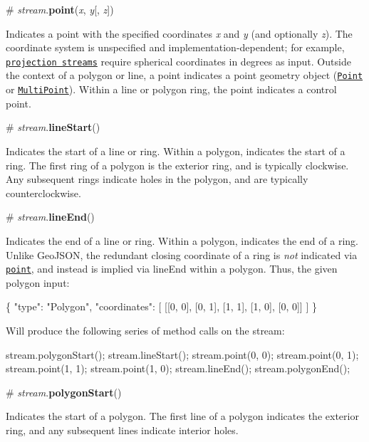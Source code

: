 \label{_stream_point}%
\# {\itshape stream}.{\bfseries point}({\itshape x}, {\itshape y}\mbox{[}, {\itshape z}\mbox{]})

Indicates a point with the specified coordinates {\itshape x} and {\itshape y} (and optionally {\itshape z}). The coordinate system is unspecified and implementation-\/dependent; for example, \href{https://github.com/d3/d3-geo-projection}{\tt projection streams} require spherical coordinates in degrees as input. Outside the context of a polygon or line, a point indicates a point geometry object (\href{http://www.geojson.org/geojson-spec.html#point}{\tt Point} or \href{http://www.geojson.org/geojson-spec.html#multipoint}{\tt Multi\+Point}). Within a line or polygon ring, the point indicates a control point.

\label{_stream_lineStart}%
\# {\itshape stream}.{\bfseries line\+Start}()

Indicates the start of a line or ring. Within a polygon, indicates the start of a ring. The first ring of a polygon is the exterior ring, and is typically clockwise. Any subsequent rings indicate holes in the polygon, and are typically counterclockwise.

\label{_stream_lineEnd}%
\# {\itshape stream}.{\bfseries line\+End}()

Indicates the end of a line or ring. Within a polygon, indicates the end of a ring. Unlike Geo\+J\+S\+ON, the redundant closing coordinate of a ring is {\itshape not} indicated via \href{#point}{\tt point}, and instead is implied via line\+End within a polygon. Thus, the given polygon input\+:


\begin{DoxyCode}
\{
  "type": "Polygon",
  "coordinates": [
    [[0, 0], [0, 1], [1, 1], [1, 0], [0, 0]]
  ]
\}
\end{DoxyCode}


Will produce the following series of method calls on the stream\+:


\begin{DoxyCode}
stream.polygonStart();
stream.lineStart();
stream.point(0, 0);
stream.point(0, 1);
stream.point(1, 1);
stream.point(1, 0);
stream.lineEnd();
stream.polygonEnd();
\end{DoxyCode}


\label{_stream_polygonStart}%
\# {\itshape stream}.{\bfseries polygon\+Start}()

Indicates the start of a polygon. The first line of a polygon indicates the exterior ring, and any subsequent lines indicate interior holes.

